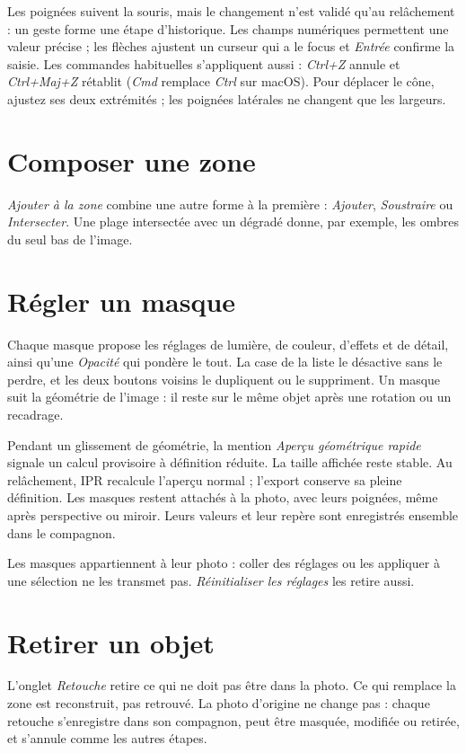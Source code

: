 Les poignées suivent la souris, mais le changement n’est validé qu’au relâchement : un geste
forme une étape d’historique. Les champs numériques permettent une valeur précise ; les
flèches ajustent un curseur qui a le focus et \emph{Entrée} confirme la saisie. Les commandes
habituelles s’appliquent aussi : \emph{Ctrl+Z} annule et \emph{Ctrl+Maj+Z} rétablit
(\emph{Cmd} remplace \emph{Ctrl} sur macOS). Pour déplacer
le cône, ajustez ses deux extrémités ; les poignées latérales ne changent que les largeurs.

\section{Composer une zone}
\emph{Ajouter à la zone} combine une autre forme à la première : \emph{Ajouter}, \emph{Soustraire}
ou \emph{Intersecter}. Une plage intersectée avec un dégradé donne, par exemple, les ombres du
seul bas de l’image.

\section{Régler un masque}
Chaque masque propose les réglages de lumière, de couleur, d’effets et de détail, ainsi qu’une
\emph{Opacité} qui pondère le tout. La case de la liste le désactive sans le perdre, et les deux
boutons voisins le dupliquent ou le suppriment. Un masque suit la géométrie de l’image : il reste
sur le même objet après une rotation ou un recadrage.

Pendant un glissement de géométrie, la mention \emph{Aperçu géométrique rapide}
signale un calcul provisoire à définition réduite. La taille affichée reste stable.
Au relâchement, IPR recalcule l’aperçu normal ; l’export conserve sa pleine définition.
Les masques restent attachés à la photo, avec leurs poignées, même après perspective
ou miroir. Leurs valeurs et leur repère sont enregistrés ensemble dans le compagnon.

Les masques appartiennent à leur photo : coller des réglages ou les appliquer à une sélection ne
les transmet pas. \emph{Réinitialiser les réglages} les retire aussi.

\section{Retirer un objet}
L’onglet \emph{Retouche} retire ce qui ne doit pas être dans la photo. Ce qui remplace la zone est
reconstruit, pas retrouvé. La photo d’origine ne change pas : chaque retouche s’enregistre dans son
compagnon, peut être masquée, modifiée ou retirée, et s’annule comme les autres étapes.

